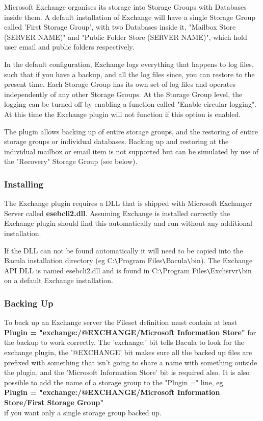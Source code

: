 Microsoft Exchange organises its storage into Storage Groups with
Databases inside them. A default installation of Exchange will have a
single Storage Group called 'First Storage Group', with two Databases
inside it, "Mailbox Store (SERVER NAME)" and 
"Public Folder Store (SERVER NAME)", 
which hold user email and public folders respectively.

In the default configuration, Exchange logs everything that happens to
log files, such that if you have a backup, and all the log files since,
you can restore to the present time. Each Storage Group has its own set
of log files and operates independently of any other Storage Groups. At
the Storage Group level, the logging can be turned off by enabling a
function called "Enable circular logging". At this time the Exchange
plugin will not function if this option is enabled.

The plugin allows backing up of entire storage groups, and the restoring
of entire storage groups or individual databases. Backing up and
restoring at the individual mailbox or email item is not supported but
can be simulated by use of the "Recovery" Storage Group (see below).

\subsubsection{Installing}
The Exchange plugin requires a DLL that is shipped with Microsoft
Exchanger Server called {\bf esebcli2.dll}. Assuming Exchange is installed
correctly the Exchange plugin should find this automatically and run
without any additional installation.

If the DLL can not be found automatically it will need to be copied into
the Bacula installation
directory (eg C:\verb+\+Program Files\verb+\+Bacula\verb+\+bin). The Exchange API DLL is
named esebcli2.dll and is found in C:\verb+\+Program Files\verb+\+Exchsrvr\verb+\+bin on a
default Exchange installation.

\subsubsection{Backing Up}
To back up an Exchange server the Fileset definition must contain at
least {\bf Plugin = "exchange:/@EXCHANGE/Microsoft Information Store"} for
the backup to work correctly. The 'exchange:' bit tells Bacula to look
for the exchange plugin, the '@EXCHANGE' bit makes sure all the backed
up files are prefixed with something that isn't going to share a name
with something outside the plugin, and the 'Microsoft Information Store'
bit is required also. It is also possible to add the name of a storage
group to the "Plugin =" line, eg \\
{\bf Plugin = "exchange:/@EXCHANGE/Microsoft Information Store/First Storage Group"} \\
if you want only a single storage group backed up.

